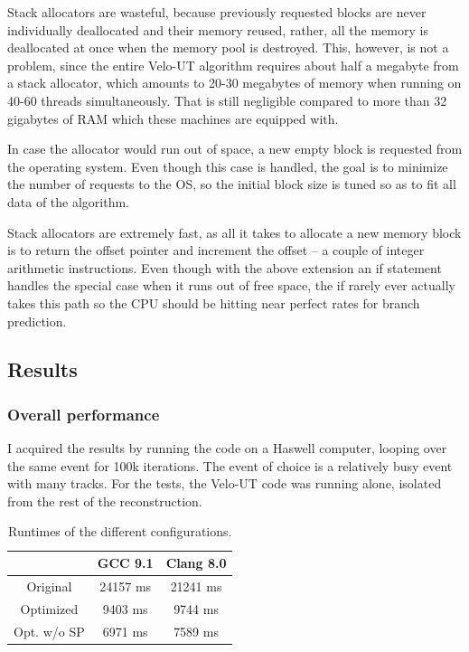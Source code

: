 \documentclass[12pt]{article}
\begin{document}
Stack allocators are wasteful, because previously requested blocks are never individually deallocated and their memory reused, rather, all the memory is deallocated at once when the memory pool is destroyed. This, however, is not a problem, since the entire Velo-UT algorithm requires about half a megabyte from a stack allocator, which amounts to 20-30 megabytes of memory when running on 40-60 threads simultaneously. That is still negligible compared to more than 32 gigabytes of RAM which these machines are equipped with.

In case the allocator would run out of space, a new empty block is requested from the operating system. Even though this case is handled, the goal is to minimize the number of requests to the OS, so the initial block size is tuned so as to fit all data of the algorithm.

Stack allocators are extremely fast, as all it takes to allocate a new memory block is to return the offset pointer and increment the offset -- a couple of integer arithmetic instructions. Even though with the above extension an if statement handles the special case when it runs out of free space, the if rarely ever actually takes this path so the CPU should be hitting near perfect rates for branch prediction.


\subsection{Results}

\subsubsection{Overall performance}

I acquired the results by running the code on a Haswell computer, looping over the same event for 100k iterations. The event of choice is a relatively busy event with many tracks. For the tests, the Velo-UT code was running alone, isolated from the rest of the reconstruction.

\begin{table}[H]
	\centering
	\begin{tabular}{c | c | c}
		& GCC 9.1 & Clang 8.0 \\
		\hline
		Original & 24157 ms & 21241 ms \\
		\hline
		Optimized & 9403 ms & 9744 ms \\
		\hline
		Opt. w/o SP & 6971 ms & 7589 ms
	\end{tabular}
	\caption{Runtimes of the different configurations.}
	\label{tbl_runtimes_local}
\end{table}
	
\end{document}
